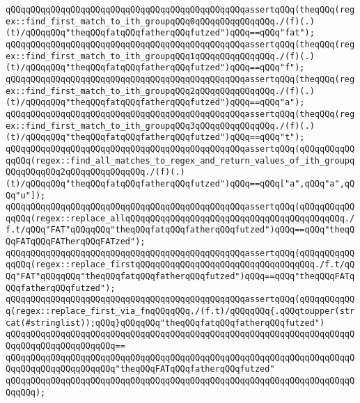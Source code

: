 \verb|qQQqqQQqqQQqqQQqqQQqqQQqqQQqqQQqqQQqqQQqqQQqqQQqassertqQQq(theqQQq(regex::find_first_match_to_ith_groupqQQq0qQQqqQQqqQQqqQQq./(f)(.)(t)/qQQqqQQq"theqQQqfatqQQqfatherqQQqfutzed")qQQq==qQQq"fat");|\newline
\verb|qQQqqQQqqQQqqQQqqQQqqQQqqQQqqQQqqQQqqQQqqQQqqQQqassertqQQq(theqQQq(regex::find_first_match_to_ith_groupqQQq1qQQqqQQqqQQqqQQq./(f)(.)(t)/qQQqqQQq"theqQQqfatqQQqfatherqQQqfutzed")qQQq==qQQq"f");|\newline
\verb|qQQqqQQqqQQqqQQqqQQqqQQqqQQqqQQqqQQqqQQqqQQqqQQqassertqQQq(theqQQq(regex::find_first_match_to_ith_groupqQQq2qQQqqQQqqQQqqQQq./(f)(.)(t)/qQQqqQQq"theqQQqfatqQQqfatherqQQqfutzed")qQQq==qQQq"a");|\newline
\verb|qQQqqQQqqQQqqQQqqQQqqQQqqQQqqQQqqQQqqQQqqQQqqQQqassertqQQq(theqQQq(regex::find_first_match_to_ith_groupqQQq3qQQqqQQqqQQqqQQq./(f)(.)(t)/qQQqqQQq"theqQQqfatqQQqfatherqQQqfutzed")qQQq==qQQq"t");|\newline
\verb|qQQqqQQqqQQqqQQqqQQqqQQqqQQqqQQqqQQqqQQqqQQqqQQqassertqQQq(qQQqqQQqqQQqqQQq(regex::find_all_matches_to_regex_and_return_values_of_ith_groupqQQqqQQqqQQq2qQQqqQQqqQQqqQQq./(f)(.)(t)/qQQqqQQq"theqQQqfatqQQqfatherqQQqfutzed")qQQq==qQQq["a",qQQq"a",qQQq"u"]);|\newline
\verb|qQQqqQQqqQQqqQQqqQQqqQQqqQQqqQQqqQQqqQQqqQQqqQQqassertqQQq(qQQqqQQqqQQqqQQq(regex::replace_allqQQqqQQqqQQqqQQqqQQqqQQqqQQqqQQqqQQqqQQqqQQq./f.t/qQQq"FAT"qQQqqQQq"theqQQqfatqQQqfatherqQQqfutzed")qQQq==qQQq"theqQQqFATqQQqFATherqQQqFATzed");|\newline
\verb|qQQqqQQqqQQqqQQqqQQqqQQqqQQqqQQqqQQqqQQqqQQqqQQqassertqQQq(qQQqqQQqqQQqqQQq(regex::replace_firstqQQqqQQqqQQqqQQqqQQqqQQqqQQqqQQqqQQq./f.t/qQQq"FAT"qQQqqQQq"theqQQqfatqQQqfatherqQQqfutzed")qQQq==qQQq"theqQQqFATqQQqfatherqQQqfutzed");|\newline
\newline
\newline
\verb|qQQqqQQqqQQqqQQqqQQqqQQqqQQqqQQqqQQqqQQqqQQqqQQqassertqQQq(qQQqqQQqqQQq(regex::replace_first_via_fnqQQqqQQq./(f.t)/qQQqqQQq{.qQQqtoupper(strcat(#stringlist));qQQq}qQQqqQQq"theqQQqfatqQQqfatherqQQqfutzed")|\newline
\verb|qQQqqQQqqQQqqQQqqQQqqQQqqQQqqQQqqQQqqQQqqQQqqQQqqQQqqQQqqQQqqQQqqQQqqQQqqQQqqQQqqQQqqQQqqQQq==|\newline
\verb|qQQqqQQqqQQqqQQqqQQqqQQqqQQqqQQqqQQqqQQqqQQqqQQqqQQqqQQqqQQqqQQqqQQqqQQqqQQqqQQqqQQqqQQqqQQq"theqQQqFATqQQqfatherqQQqfutzed"|\newline
\verb|qQQqqQQqqQQqqQQqqQQqqQQqqQQqqQQqqQQqqQQqqQQqqQQqqQQqqQQqqQQqqQQqqQQqqQQqqQQq);|\newline
